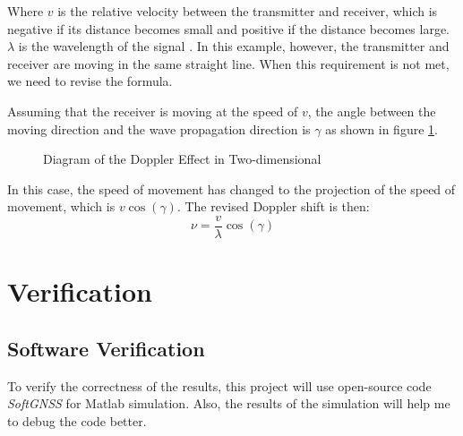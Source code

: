 Where $v$ is the relative velocity between the transmitter and receiver, which is negative if its distance becomes small and positive if the distance becomes large. $\lambda$ is the wavelength of the signal \cite{RN203}. In this example, however, the transmitter and receiver are moving in the same straight line. When this requirement is not met, we need to revise the formula.

Assuming that the receiver is moving at the speed of $v$, the angle between the moving direction and the wave propagation direction is $\gamma$ as shown in figure \ref{fig:doppler}.

\begin{figure}[!htbp]
    \centering
    
    \caption{Diagram of the Doppler Effect in Two-dimensional}
    \label{fig:doppler}
\end{figure}

In this case, the speed of movement has changed to the projection of the speed of movement, which is $v\cos(\gamma)$. The revised Doppler shift is then:
\begin{equation}
    \nu =\frac{v}{\lambda}\cos(\gamma)
\end{equation}

\section{Verification}
\subsection{Software Verification}
To verify the correctness of the results, this project will use open-source code \textit{SoftGNSS} for Matlab simulation. Also, the results of the simulation will help me to debug the code better.

